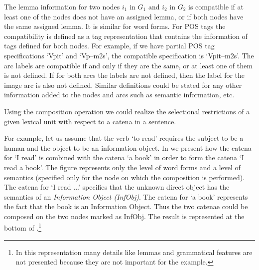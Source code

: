 \documentclass[output=paper,colorlinks,citecolor=brown]{langscibook}
\begin{document}
The lemma information for two nodes $i_1$ in $G_1$ and $i_2$ in $G_2$ is compatible if at least one of the nodes does not have an assigned lemma, or if both nodes have the same assigned lemma. It is similar for word forms. For POS tags the compatibility is defined as a tag representation that contains the information of tags defined for both nodes. For example, if we have partial POS tag specifications `Vpit' and `Vp--m2s', the compatible specification is `Vpit--m2s'.
The arc labels are compatible if and only if they are the same, or at least one of them is not defined. If for both arcs the labels are not defined, then the label for the image arc is also not defined.
Similar definitions could be stated for any other information added to the nodes and arcs such as semantic information, etc.

Using the composition operation we could realize the selectional restrictions of a given lexical unit with respect to a catena in a sentence.

For example, let us assume that the verb `to read' requires the subject to be a human and the object to be an information object. In  we present how the catena for `I read' is combined with the catena `a book' in order to form the catena `I read a book'. The figure represents only the level of word forms and a level of semantics (specified only for the node on which the composition is performed). The catena for `I read ...' specifies that the unknown direct object has the semantics of an \textit{Information Object (InfObj)}. The catena for `a book' represents the fact that the book is an Information Object. Thus the two catenae could be composed on the two nodes marked as InfObj. The result is represented at the bottom of .\footnote{In this representation many details like lemmas and grammatical features are not presented because they are not important for the example.}
\end{document}

